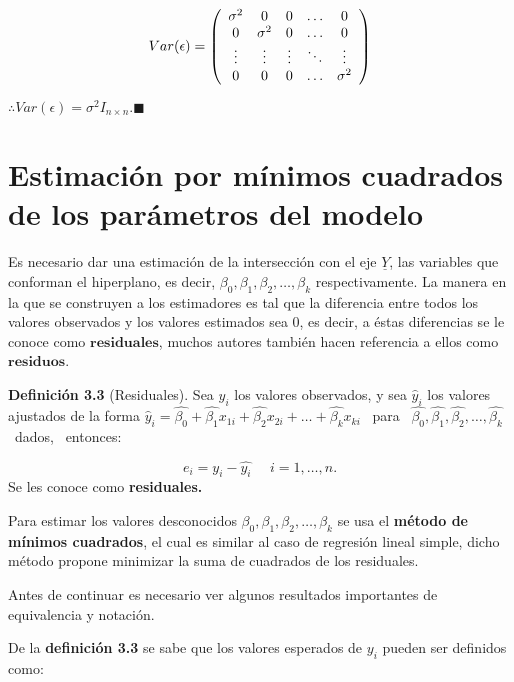 \documentclass[a4paper,oneside,openany]{book}
\begin{document}
\[
\begin{equation*}
Var(\epsilon)=
\left(
\begin{array}{c c c c c}
\sigma^2 & 0 & 0 & \ldots & 0 \\ 
0&\sigma^2 & 0 & \ldots & 0 \\
\vdots & \vdots & \vdots & \ddots & \vdots\\
0 & 0 & 0 & \ldots &\sigma^2  \\
\end{array}
\right)
\end{equation*}
\]

\(\therefore Var(\epsilon)=\sigma^2 I_{n \times n}. \blacksquare\)

\section{Estimación por mínimos cuadrados de los parámetros del
modelo}\label{estimaciuxf3n-por-muxednimos-cuadrados-de-los-paruxe1metros-del-modelo-2}

Es necesario dar una estimación de la intersección con el eje
\(\underline{Y}\), las variables que conforman el hiperplano, es decir,
\(\beta_{0},\beta_{1},\beta_{2},\ldots,\beta_{k}\) respectivamente. La
manera en la que se construyen a los estimadores es tal que la
diferencia entre todos los valores observados y los valores estimados
sea 0, es decir, a éstas diferencias se le conoce como
\(\mathbf{residuales}\), muchos autores también hacen referencia a ellos
como \(\mathbf{residuos}\).

\textbf{Definición 3.3} (Residuales). Sea \(y_{i}\) los valores
observados, y sea \(\hat{y}_{i}\) los valores ajustados de la forma
\(\hat{y}_{i}=\hat{\beta_{0}}+\hat{\beta_{1}}x_{1i}+\hat{\beta_{2}}x_{2i}+ \ldots +\hat{\beta_{k}}x_{ki}\)
~para
~\(\hat{\beta_{0}},\hat{\beta_{1}},\hat{\beta_{2}}, \ldots, \hat{\beta_{k}}\)
~dados, ~entonces:

\[e_{i}=y_{i}-\hat{y_{i}} \ \ \ \ \ \ i=1, \ldots,n.\] Se les conoce
como \textbf{residuales.}

Para estimar los valores desconocidos
\(\beta_{0},\beta_{1},\beta_{2},\ldots,\beta_{k}\) se usa el
\textbf{método de mínimos cuadrados}, el cual es similar al caso de
regresión lineal simple, dicho método propone minimizar la suma de
cuadrados de los residuales.

Antes de continuar es necesario ver algunos resultados importantes de
equivalencia y notación.

De la \textbf{definición 3.3} se sabe que los valores esperados de
\(y_{i}\) pueden ser definidos como:
\end{document}
